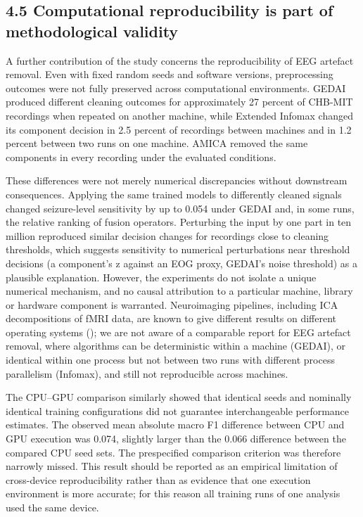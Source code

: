 \documentclass[11pt,a4paper]{article}
\begin{document}
\subsection{4.5 Computational reproducibility is part of methodological validity}\label{computational-reproducibility-is-part-of-methodological-validity}

A further contribution of the study concerns the reproducibility of EEG artefact
removal. Even with fixed random seeds and software versions, preprocessing outcomes were
not fully preserved across computational environments. GEDAI produced different cleaning
outcomes for approximately 27 percent of CHB-MIT recordings when repeated on another
machine, while Extended Infomax changed its component decision in 2.5 percent of
recordings between machines and in 1.2 percent between two runs on one machine. AMICA
removed the same components in every recording under the evaluated conditions.

These differences were not merely numerical discrepancies without downstream
consequences. Applying the same trained models to differently cleaned signals changed
seizure-level sensitivity by up to 0.054 under GEDAI and, in some runs, the relative
ranking of fusion operators. Perturbing the input by one part in ten million reproduced
similar decision changes for recordings close to cleaning thresholds, which suggests
sensitivity to numerical perturbations near threshold decisions (a component's \textbar z\textbar{}
against an EOG proxy, GEDAI's noise threshold) as a plausible explanation. However, the
experiments do not isolate a unique numerical mechanism, and no causal attribution to a
particular machine, library or hardware component is warranted. Neuroimaging pipelines,
including ICA decompositions of fMRI data, are known to give different results on
different operating systems (\citealp{Glatard_2015}); we are not aware of a comparable report
for EEG artefact removal, where algorithms can be deterministic within a machine
(GEDAI), or identical within one process but not between two runs with different process parallelism (Infomax), and still not reproducible across machines.

The CPU--GPU comparison similarly showed that identical seeds and nominally identical
training configurations did not guarantee interchangeable performance estimates. The
observed mean absolute macro F1 difference between CPU and GPU execution was 0.074,
slightly larger than the 0.066 difference between the compared CPU seed sets. The
prespecified comparison criterion was therefore narrowly missed. This result should be
reported as an empirical limitation of cross-device reproducibility rather than as
evidence that one execution environment is more accurate; for this reason all training
runs of one analysis used the same device.
\end{document}
